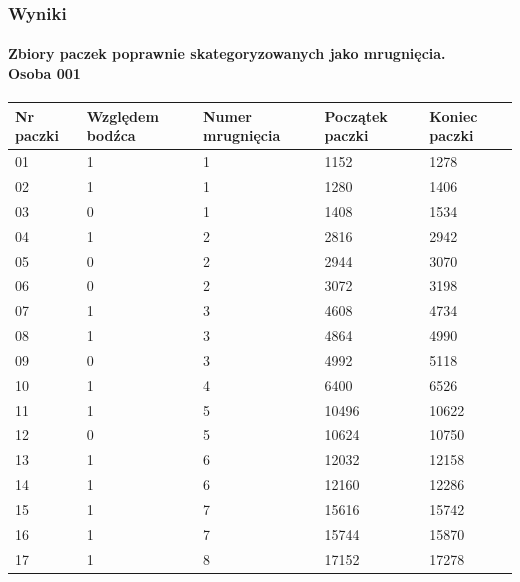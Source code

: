 \documentclass{beamer}
\begin{document}
\begin{frame}
\frametitle{Wyniki}
\framesubtitle {Zbiory paczek poprawnie skategoryzowanych jako mrugnięcia. \\ Osoba 001}
        \begin{table}[H]
            \begin{center}
                \begin{tabular}{| p{1.25cm} | p{1.75cm} | p{2cm} | p{1.75cm} | p{1.75cm} |}
                    \hline
                    Nr paczki & Względem bodźca & Numer mrugnięcia & Początek paczki & Koniec paczki \\
                    \hline
                    \hline
                    01 & 1 & 1 & 1152 & 1278 \\ 
                    \hline
                    02 & 1 & 1 & 1280 & 1406 \\ 
                    \hline
                    03 & 0 & 1 & 1408 & 1534 \\ 
                    \hline
                    04 & 1 & 2 & 2816 & 2942 \\ 
                    \hline
                    05 & 0 & 2 & 2944 & 3070 \\ 
                    \hline
                    06 & 0 & 2 & 3072 & 3198 \\ 
                    \hline
                    07 & 1 & 3 & 4608 & 4734 \\ 
                    \hline
                    08 & 1 & 3 & 4864 & 4990 \\ 
                    \hline
                    09 & 0 & 3 & 4992 & 5118 \\ 
                    \hline
                    10 & 1 & 4 & 6400 & 6526 \\ 
                    \hline
                    11 & 1 & 5 & 10496 & 10622 \\ 
                    \hline
                    12 & 0 & 5 & 10624 & 10750 \\ 
                    \hline
                    13 & 1 & 6 & 12032 & 12158 \\ 
                    \hline
                    14 & 1 & 6 & 12160 & 12286 \\ 
                    \hline
                    15 & 1 & 7 & 15616 & 15742 \\ 
                    \hline
                    16 & 1 & 7 & 15744 & 15870 \\ 
                    \hline
                    17 & 1 & 8 & 17152 & 17278 \\ 

\end{tabular}
\end{center}
\end{table}
\end{frame}
\end{document}
